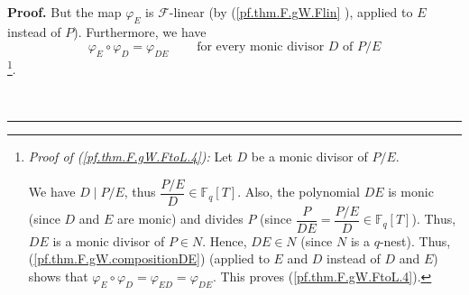 \documentclass[numbers=enddot,12pt,final,onecolumn,notitlepage]{scrartcl}%
\theoremstyle{definition}
\newenvironment{proof}[1][Proof]{\noindent\textbf{#1.} }{\ \rule{0.5em}{0.5em}}
\begin{document}
\begin{proof}
But the map $\varphi_{E}$ is $\mathcal{F}$-linear (by (\ref{pf.thm.F.gW.Flin}%
), applied to $E$ instead of $P$). Furthermore, we have%
\begin{equation}
\varphi_{E}\circ\varphi_{D}=\varphi_{DE}\ \ \ \ \ \ \ \ \ \ \text{for every
monic divisor }D\text{ of }P/E \label{pf.thm.F.gW.FtoL.4}%
\end{equation}
\footnote{\textit{Proof of (\ref{pf.thm.F.gW.FtoL.4}):} Let $D$ be a monic
divisor of $P/E$.
\par
We have $D\mid P/E$, thus $\dfrac{P/E}{D}\in\mathbb{F}_{q}\left[  T\right]  $.
Also, the polynomial $DE$ is monic (since $D$ and $E$ are monic) and divides
$P$ (since $\dfrac{P}{DE}=\dfrac{P/E}{D}\in\mathbb{F}_{q}\left[  T\right]  $).
Thus, $DE$ is a monic divisor of $P\in N$. Hence, $DE\in N$ (since $N$ is a
$q$-nest). Thus, (\ref{pf.thm.F.gW.compositionDE}) (applied to $E$ and $D$
instead of $D$ and $E$) shows that $\varphi_{E}\circ\varphi_{D}=\varphi
_{ED}=\varphi_{DE}$. This proves (\ref{pf.thm.F.gW.FtoL.4}).}.


\end{proof}
\end{document}
